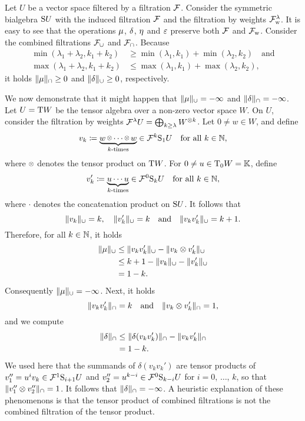 \documentclass[\MainFolder/Text.tex]{subfiles}
\begin{document}
\begin{Example}\label{Ex:CombinedOnSymetric}
Let $U$ be a vector space filtered by a filtration $\mathcal{F}$. Consider the symmetric bialgebra $\mathrm{S} U$ with the induced filtration $\mathcal{F}$ and the filtration by weights $\mathcal{F}_{\mathrm{w}}^\lambda$. It is easy to see that the operations $\mu$, $\delta$, $\eta$ and $\varepsilon$ preserve both $\mathcal{F}$ and $\mathcal{F}_{\mathrm{w}}$. Consider the combined filtrations $\mathcal{F}_\cup$ and $\mathcal{F}_\cap$. Because
\begin{align*}
\min(\lambda_1 + \lambda_2,k_1+k_2) &\ge \min(\lambda_1,k_1) + \min(\lambda_2,k_2)\quad\text{and}\\
\max(\lambda_1 + \lambda_2,k_1+k_2) &\le \max(\lambda_1,k_1) + \max(\lambda_2,k_2),
\end{align*}
it holds $\| \mu \|_\cap \ge 0$ and $\| \delta \|_\cup\ge 0$, respectively.

We now demonstrate that it might happen that $\| \mu \|_\cup = - \infty$ and $\| \delta \|_\cap = -\infty$. Let $U = \mathrm{T} W$ be the tensor algebra over a non-zero vector space $W$. On $U$, consider the filtration by weights $\mathcal{F}^\lambda U = \bigoplus_{k\ge \lambda} W^{\otimes k}$. Let $0\neq w\in W$, and define 
$$ v_k \coloneqq \underbrace{w\smallotimes \dotsb \smallotimes w}_{k\text{-times}} \in \Filtr^{k} \Sym_1 U\quad\text{for all }k\in\N, $$
where $\smallotimes$ denotes the tensor product on $\mathrm{T} W$. For $0\neq u \in \mathrm{T}_0 W = \mathbb{K}$, define 
$$ v_k' \coloneqq \underbrace{u\dotsb u}_{k\text{-times}} \in \mathcal{F}^0 \mathrm{S}_k U\quad\text{for all }k\in \mathbb{N}, $$
where $\cdot$ denotes the concatenation product on $\mathrm{S} U$. It follows that 
$$ \| v_k \|_{\cup} = k,\quad\| v_k' \|_{\cup} = k\quad\text{and}\quad\| v_k v_k' \|_\cup = k+1. $$
Therefore, for all $k\in \mathbb{N}$, it holds
\begin{align*}
\| \mu \|_\cup &\le \| v_k v_k' \|_\cup - \| v_k \otimes v_k' \|_{\cup} \\
&\le k + 1 - \| v_k \|_\cup - \| v_k' \|_\cup \\
&=  1 - k.
\end{align*}
Consequently $\| \mu \|_\cup = -\infty$. Next, it holds 
$$ \| v_k v_k' \|_\cap = k\quad\text{and}\quad\| v_k\otimes v_k' \|_\cap = 1, $$
and we compute
\begin{align*}
\| \delta \|_\cap &\le \| \delta(v_k v_k') \|_\cap - \| v_k v_k' \|_\cap \\ 
&=  1 - k.
\end{align*}
We used here that the summands of $\delta(v_k v_k')$ are tensor products of $v_1''=u^{i} v_k \in \mathcal{F}^1 \mathrm{S}_{i+1} U$ and $v_2''=u^{k-i} \in \mathcal{F}^0 \mathrm{S}_{k-i} U$ for $i=0$, $\dotsc$, $k$, so that $\| v_1'' \otimes v_2'' \|_\cap = 1$. It follows that $\| \delta \|_\cap = -\infty$. A heuristic explanation of these phenomenons is that the tensor product of combined filtrations is not the combined filtration of the tensor product.


\end{Example}
\end{document}
